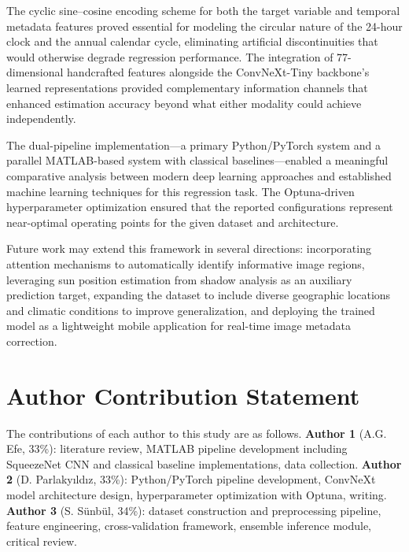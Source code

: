 \documentclass[9pt, a4paper, twocolumn]{article}
\begin{document}
The cyclic sine--cosine encoding scheme for both the target variable and temporal metadata features proved essential for modeling the circular nature of the 24-hour clock and the annual calendar cycle, eliminating artificial discontinuities that would otherwise degrade regression performance. The integration of 77-dimensional handcrafted features alongside the ConvNeXt-Tiny backbone's learned representations provided complementary information channels that enhanced estimation accuracy beyond what either modality could achieve independently.

The dual-pipeline implementation---a primary Python/PyTorch system and a parallel MATLAB-based system with classical baselines---enabled a meaningful comparative analysis between modern deep learning approaches and established machine learning techniques for this regression task. The Optuna-driven hyperparameter optimization ensured that the reported configurations represent near-optimal operating points for the given dataset and architecture.

Future work may extend this framework in several directions: incorporating attention mechanisms to automatically identify informative image regions, leveraging sun position estimation from shadow analysis as an auxiliary prediction target, expanding the dataset to include diverse geographic locations and climatic conditions to improve generalization, and deploying the trained model as a lightweight mobile application for real-time image metadata correction.


\section*{Author Contribution Statement}

The contributions of each author to this study are as follows. \textbf{Author 1} (A.G. Efe, 33\%): literature review, MATLAB pipeline development including SqueezeNet CNN and classical baseline implementations, data collection. \textbf{Author 2} (D. Parlaky\i ld\i z, 33\%): Python/PyTorch pipeline development, ConvNeXt model architecture design, hyperparameter optimization with Optuna, writing. \textbf{Author 3} (S. S\"unb\"ul, 34\%): dataset construction and preprocessing pipeline, feature engineering, cross-validation framework, ensemble inference module, critical review.
\end{document}
